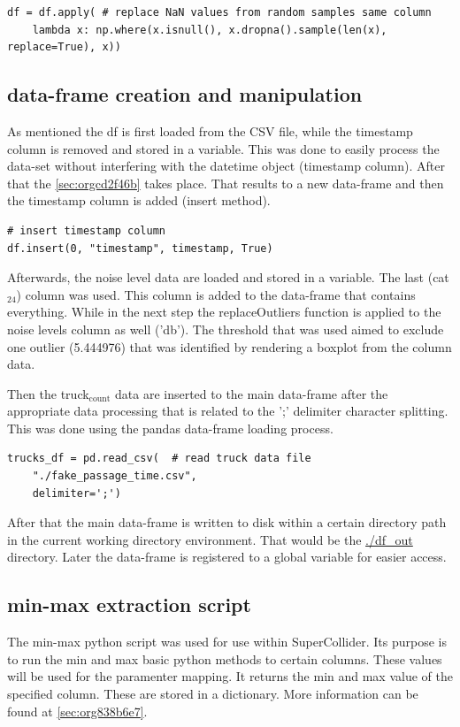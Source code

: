 \documentclass[11pt]{article}
\begin{document}
\begin{verbatim}
df = df.apply( # replace NaN values from random samples same column
    lambda x: np.where(x.isnull(), x.dropna().sample(len(x), replace=True), x))
\end{verbatim}

\subsection{data-frame creation and manipulation}
\label{sec:orgcb89335}
As mentioned the df is first loaded from the CSV file, while the timestamp column is removed and stored in a variable.  This was done to easily process the data-set without interfering with the datetime object (timestamp column).  After that the \ref{sec:orgcd2f46b} takes place.  That results to a new data-frame and then the timestamp column is added (insert method).
\begin{verbatim}
# insert timestamp column
df.insert(0, "timestamp", timestamp, True)
\end{verbatim}

Afterwards, the noise level data are loaded and stored in a variable.  The last (cat\(_{\text{24}}\)) column was used.  This column is added to the data-frame that contains everything.  While in the next step the replaceOutliers function is applied to the noise levels column as well ('db').  The threshold that was used aimed to exclude one outlier (5.444976) that was identified by rendering a boxplot from the column data.

Then the truck\(_{\text{count}}\) data are inserted to the main data-frame after the appropriate data processing that is related to the ';' delimiter character splitting. This was done using the pandas data-frame loading process.

\begin{verbatim}
trucks_df = pd.read_csv(  # read truck data file
    "./fake_passage_time.csv",
    delimiter=';')
\end{verbatim}

After that the main data-frame is written to disk within a certain directory path in the current working directory environment.  That would be the \url{./df\_out} directory.
Later the data-frame is registered to a global variable for easier access.

\subsection{min-max extraction script}
\label{sec:org2513f09}
The min-max python script was used for use within SuperCollider.  Its purpose is to run the min and max basic python methods to certain columns.  These values will be used for the paramenter mapping.  It returns the min and max value of the specified column.  These are stored in a dictionary.  More information can be found at  \ref{sec:org838b6e7}.
\end{document}
